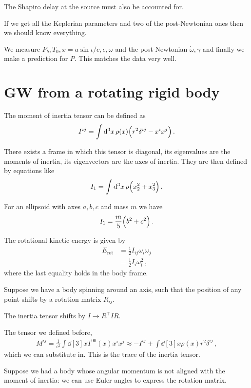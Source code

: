 \documentclass[main.tex]{subfiles}
\begin{document}
The Shapiro delay at the source must also be accounted for. 

If we get all the Keplerian parameters and two of the post-Newtonian ones then we should know everything.

We measure \(P_b, T_0, x= a \sin \iota /c, e, \omega \) and the post-Newtonian \(\dot{\omega}, \gamma \) and finally we make a prediction for \(\dot{P}\). This matches the data very well.

\section{GW from a rotating rigid body}

The moment of inertia tensor can be defined as 
%
\begin{align}
I^{ij} = \int \dd[3]{x} \rho (x) \qty(r^2 \delta^{ij} - x^{i} x^{j})
\,.
\end{align}

There exists a frame in which this tensor is diagonal, its eigenvalues are the moments of inertia, its eigenvectors are the axes of inertia.
They are then defined by equations like 
%
\begin{align}
I_1 = \int \dd[3]{x} \rho \qty(x_2^2 + x_3^2) 
\,.
\end{align}
 
For an ellipsoid with axes \(a, b, c\) and mass \(m\) we have 
%
\begin{align}
I_1 = \frac{m}{5} \qty(b^2 +c^2)
\,.
\end{align}

The rotational kinetic energy is given by 
%
\begin{align}
E _{\text{rot}} &= \frac{1}{2} I_{ij} \omega_{i} \omega_{j} \\ 
&= \frac{1}{2} I_i \omega_{i}^2
\,,
\end{align}
%
where the last equality holds in the body frame. 

Suppose we have a body spinning around an axis, such that the position of any point shifts by a rotation matrix \(R_{ij}\). 

The inertia tensor shifts by \(I \rightarrow R^{\top} I R\).

The tensor we defined before, 
%
\begin{align}
M^{ij} = \frac{1}{c^2} \int \dd[3]{x} T^{00} (x) x^{i} x^{j} 
\approx - I^{ij} + \int \dd[3]{x} \rho (x) r^2 \delta^{ij}
\,,
\end{align}
%
which we can substitute in. This is the trace of the inertia tensor. 

Suppose we had a body whose angular momentum is not aligned with the moment of inertia: we can use Euler angles to express the rotation matrix.
\end{document}

